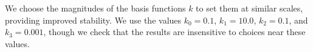 \documentclass[modern]{aastex62}
\begin{document}
We choose the magnitudes of the basis functions $k$ to set them at similar scales, providing improved stability.
We use the values $k_0=0.1$, $k_1=10.0$, $k_2=0.1$, and $k_3=0.001$, though we check that the results are insensitive to choices near these values.

% 
%

\end{document}
